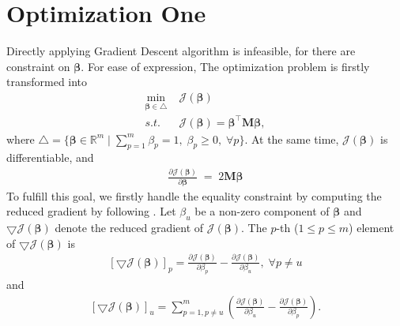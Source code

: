\documentclass{article}
\begin{document}
\section{Optimization One}

Directly applying Gradient Descent algorithm is infeasible, for there are constraint on $\boldsymbol{\beta}$.
For ease of expression, The optimization problem is firstly transformed into 
\begin{equation}\label{eq:obj_tran}
	\begin{split}
		\min_{\boldsymbol{\beta}\in \bigtriangleup} &\; \mathcal{J}(\boldsymbol{\beta}) \\
		s.t. & \; \mathcal{J}(\boldsymbol{\beta}) = \boldsymbol{\beta}^\top\mathbf{M}\boldsymbol{\beta},
	\end{split}
\end{equation}
where $\bigtriangleup = \{ \boldsymbol{\beta} \in \mathbb{R}^m\; |\; \sum_{p=1}^m \beta_p = 1,\; \beta_p\geq 0,\; \forall p\}$.
At the same time, $\mathcal{J}(\boldsymbol{\beta})$ is differentiable, and
\begin{equation}\label{eq:obj_derivative}
	\begin{split}
		\frac{\partial \mathcal{J}(\boldsymbol{\beta})}{\partial \boldsymbol{\beta}}\; =\; 2\mathbf{M}\boldsymbol{\beta}
	\end{split}
\end{equation}
To fulfill this goal, we firstly handle the equality constraint by computing the reduced gradient by following \cite{rakotomamonjy2008simplemkl}.
Let $\beta_u$ be a non-zero component of $\boldsymbol{\beta}$ and $\bigtriangledown \mathcal{J}(\boldsymbol{\beta})$ denote the reduced gradient of $\mathcal{J}(\boldsymbol{\beta})$.
The $p$-th ($1\leq p \leq m$) element of $\bigtriangledown \mathcal{J}(\boldsymbol{\beta})$ is
\begin{equation}\label{eq:p_derivative}
	\begin{split}
		[\bigtriangledown \mathcal{J}(\boldsymbol{\beta})]_p = \frac{\partial \mathcal{J}(\boldsymbol{\beta})}{\partial \beta_p} - \frac{\partial \mathcal{J}(\boldsymbol{\beta})}{\partial \beta_u},\; \forall p \neq u
	\end{split}
\end{equation}
and 
\begin{equation}\label{eq:u_derivative}
	\begin{split}
		[\bigtriangledown \mathcal{J}(\boldsymbol{\beta})]_u = \sum_{p=1,p\neq u}^m (\frac{\partial \mathcal{J}(\boldsymbol{\beta})}{\partial \beta_u} - \frac{\partial \mathcal{J}(\boldsymbol{\beta})}{\partial \beta_p}).
	\end{split}
\end{equation}
\end{document}
